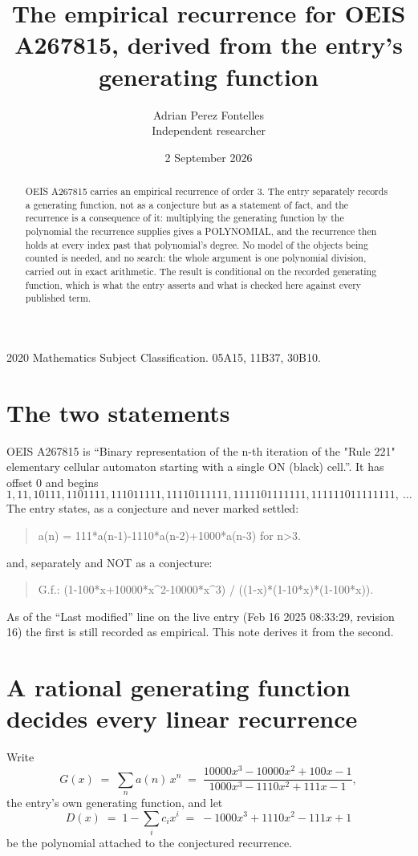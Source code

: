 \documentclass[11pt,a4paper]{article}
\title{The empirical recurrence for OEIS A267815, derived from the entry's generating function}
\author{Adrian Perez Fontelles\\ \small Independent researcher}
\date{2 September 2026}
\theoremstyle{plain}
\theoremstyle{definition}
\begin{document}
\maketitle

\begin{abstract}
OEIS A267815 carries an empirical recurrence of order $3$. The entry separately records a
generating function, not as a conjecture but as a statement of fact, and the recurrence is a
consequence of it: multiplying the generating function by the polynomial the recurrence
supplies gives a POLYNOMIAL, and the recurrence then holds at every index past that
polynomial's degree. No model of the objects being counted is needed, and no search: the
whole argument is one polynomial division, carried out in exact arithmetic. The result is
conditional on the recorded generating function, which is what the entry asserts and what is
checked here against every published term.
\end{abstract}

\noindent\small 2020 Mathematics Subject Classification. 05A15, 11B37, 30B10.\normalsize

\section{The two statements}

OEIS A267815 is ``Binary representation of the n-th iteration of the "Rule 221" elementary cellular automaton starting with a single ON (black) cell.''. It has offset $0$ and begins
\[
1, 11, 10111, 1101111, 111011111, 11110111111, 1111101111111, 111111011111111,\ \dots
\]
The entry states, as a conjecture and never marked settled:
\begin{quote}
a(n) = 111*a(n-1)-1110*a(n-2)+1000*a(n-3) for n>3.
\end{quote}
and, separately and NOT as a conjecture:
\begin{quote}
G.f.: (1-100*x+10000*x\^{}2-10000*x\^{}3) / ((1-x)*(1-10*x)*(1-100*x)).
\end{quote}
As of the ``Last modified'' line on the live entry (Feb 16 2025 08:33:29, revision 16) the first is still
recorded as empirical. This note derives it from the second.

\section{A rational generating function decides every linear recurrence}

Write
\[
G(x)\;=\;\sum_{n}a(n)\,x^{n}\;=\;\frac{10000 x^{3} - 10000 x^{2} + 100 x - 1}{1000 x^{3} - 1110 x^{2} + 111 x - 1},
\]
the entry's own generating function, and let
\[
D(x)\;=\;1-\sum_i c_i x^{i}\;=\;- 1000 x^{3} + 1110 x^{2} - 111 x + 1
\]
be the polynomial attached to the conjectured recurrence.
\end{document}
